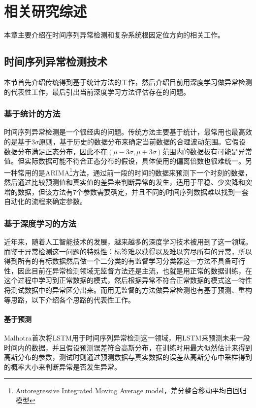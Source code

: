 
\chapter{相关研究综述}
本章主要介绍在时间序列异常检测和复杂系统根因定位方向的相关工作。
\label{cha:related:work}
\section{时间序列异常检测技术}
本节首先介绍传统得到基于统计方法的工作，然后介绍目前用深度学习做异常检测的代表性工作，最后引出当前深度学习方法评估存在的问题。
\label{sec:intro:time}
\subsection{基于统计的方法}
时间序列异常检测是一个很经典的问题。传统方法主要基于统计，最常用也最高效的是基于3$\sigma$原则，基于历史的数据分布来确定当前数据的合理波动范围。它假设数据分布满足正态分布，因此不在$(\mu - 3\sigma,\mu + 3\sigma)$范围内的数据极有可能是异常值。但实际数据可能不符合正态分布的假设，具体使用的偏离倍数也很难统一。另一种常用的是ARIMA\footnote{Autoregressive Integrated Moving Average model，差分整合移动平均自回归模型}\cite{contreras2003arima}方法，通过前一段的时间的数据来预测下一个时刻的数据，然后通过比较预测值和真实值的差异来判断异常的发生，适用于平稳、少突降和突增的数据，但该方法有7个参数需要确定，并且不同的时间序列数据难以找到一套自动化的流程来确定参数。

\subsection{基于深度学习的方法}
近年来，随着人工智能技术的发展，越来越多的深度学习技术被用到了这一领域。而鉴于异常检测这一问题的特殊性：标签难以获得以及难以穷尽所有的异常，所以得到所有的有标数据然后做一个二分类的有监督学习分类器这一方法不具备可行性，因此目前在异常检测领域无监督方法还是主流，也就是用正常的数据训练，在这个过程中学习到正常数据的模式，然后根据异常不符合正常数据的模式这一特性将测试数据中的异常区分出来。而用无监督的方法做异常检测也有基于预测、重构等思路，以下介绍各个思路的代表性工作。

\subsubsection{基于预测}

Malhotra\cite{malhotra2015long}首次将LSTM用于时间序列异常检测这一领域，用LSTM来预测未来一段时间内的数据，并且假设预测误差符合高斯分布，在训练时用最大似然估计\cite{white1982maximum}来得到高斯分布的参数，测试时则通过预测数据与真实数据的误差从高斯分布中采样得到的概率大小来判断异常是否发生异常。

